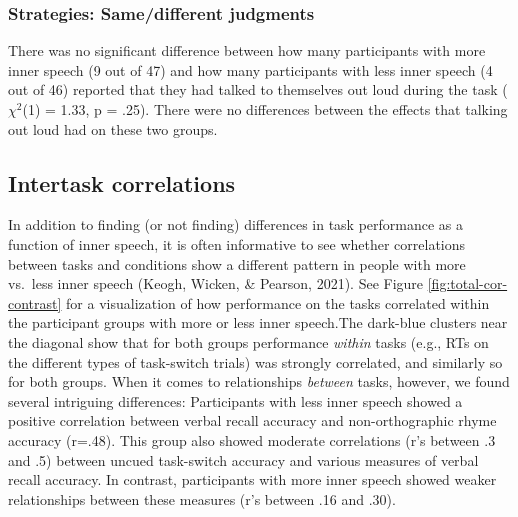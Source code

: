 \documentclass[
  man,a4paper,floatsintext]{apa6}
\begin{document}
\hypertarget{strategies-samedifferent-judgments}{%
\subsubsection{Strategies: Same/different judgments}\label{strategies-samedifferent-judgments}}

There was no significant difference between how many participants with more inner speech (9 out of 47) and how many participants with less inner speech (4 out of 46) reported that they had talked to themselves out loud during the task (\(\chi^2\)(1) = 1.33, p = .25). There were no differences between the effects that talking out loud had on these two groups.

\hypertarget{intertask-correlations}{%
\subsection{Intertask correlations}\label{intertask-correlations}}

In addition to finding (or not finding) differences in task performance as a function of inner speech, it is often informative to see whether correlations between tasks and conditions show a different pattern in people with more vs.~less inner speech (Keogh, Wicken, \& Pearson, 2021). See Figure \ref{fig:total-cor-contrast} for a visualization of how performance on the tasks correlated within the participant groups with more or less inner speech.The dark-blue clusters near the diagonal show that for both groups performance \emph{within} tasks (e.g., RTs on the different types of task-switch trials) was strongly correlated, and similarly so for both groups. When it comes to relationships \emph{between} tasks, however, we found several intriguing differences: Participants with less inner speech showed a positive correlation between verbal recall accuracy and non-orthographic rhyme accuracy (r=.48). This group also showed moderate correlations (r's between .3 and .5) between uncued task-switch accuracy and various measures of verbal recall accuracy. In contrast, participants with more inner speech showed weaker relationships between these measures (r's between .16 and .30).
\end{document}
